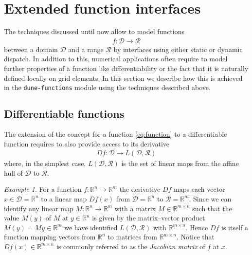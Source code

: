 \documentclass[11pt,
                 numbers=noenddot,
                 headings=normal,
                 DIV16, BCOR10mm]{scrartcl}
\theoremstyle{remark}
\newtheorem{example}{Example}
\newcommand{\dunemodule}[1]{\texttt{#1}}
\begin{document}
\section{Extended function interfaces}
\label{sec:extended_interfaces}
The techniques discussed until now allow to model functions
\begin{align}\label{eq:function}
    f:\mathcal{D} \to \mathcal{R}
\end{align}
between a domain $\mathcal{D}$ and a range $\mathcal{R}$
by interfaces using either static or dynamic dispatch.
In addition to this, numerical applications often require to model
further properties of a function like differentiability or the fact that
it is naturally defined locally on grid elements. In this section
we describe how this is achieved in the \dunemodule{dune-functions} module
using the techniques described above.

\subsection{Differentiable functions}
\label{sec:differentiable_functions}

The extension of the concept for a function \eqref{eq:function} to a differentiable
function requires to also provide access to its derivative
\begin{align}
    Df : \mathcal{D} \to L(\mathcal{D}, \mathcal{R})
\end{align}
where, in the simplest case, $L(\mathcal{D}, \mathcal{R})$ is the set of linear maps from the affine hull of $\mathcal{D}$ to $\mathcal{R}$.

\begin{example}
    For a function
    $f: \mathbb{R}^n \to \mathbb{R}^m$
    the derivative $Df$ maps each vector $x \in \mathcal{D} = \mathbb{R}^n$
    to a linear map $Df(x)$ from $\mathcal{D} = \mathbb{R}^n$ to $\mathcal{R} = \mathbb{R}^m$.
    Since we can identify any linear map $M : \mathbb{R}^n \to \mathbb{R}^m$
    with a matrix $M \in \mathbb{R}^{m \times n}$
    such that the value $M(y)$ of $M$ at $y \in \mathbb{R}^n$
    is given by the matrix--vector product $M(y) = My \in \mathbb{R}^m$
    we have identified $L(\mathcal{D}, \mathcal{R})$ with $\mathbb{R}^{m \times n}$.
    Hence $Df$ is itself a function mapping vectors from $\mathbb{R}^n$ to matrices
    from $\mathbb{R}^{m \times n}$. Notice that $Df(x) \in \mathbb{R}^{m \times n}$
    is commonly referred to as the \emph{Jacobian matrix} of $f$ at $x$.
\end{example}
\end{document}
